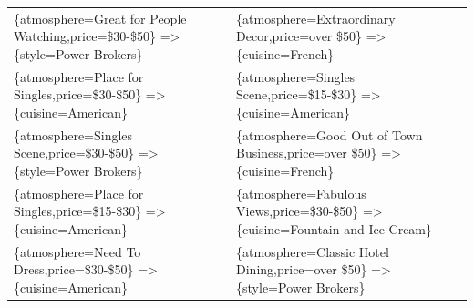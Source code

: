 \documentclass[letterpaper,10pt]{article}
\begin{document}
\begin{appendices}
\begin{table}[h]
\begin{adjustbox}{max width=\textwidth}
\begin{tabular}{ll}
\{atmosphere=Great for People Watching,price=\$30-\$50\} =\textgreater \{style=Power Brokers\} & \{atmosphere=Extraordinary Decor,price=over \$50\} =\textgreater \{cuisine=French\} \\ 
\{atmosphere=Place for Singles,price=\$30-\$50\} =\textgreater \{cuisine=American\} & \{atmosphere=Singles Scene,price=\$15-\$30\} =\textgreater \{cuisine=American\} \\ 
\{atmosphere=Singles Scene,price=\$30-\$50\} =\textgreater \{style=Power Brokers\} & \{atmosphere=Good Out of Town Business,price=over \$50\} =\textgreater \{cuisine=French\} \\ 
\{atmosphere=Place for Singles,price=\$15-\$30\} =\textgreater \{cuisine=American\} & \{atmosphere=Fabulous Views,price=\$30-\$50\} =\textgreater \{cuisine=Fountain and Ice Cream\} \\ 
\{atmosphere=Need To Dress,price=\$30-\$50\} =\textgreater \{cuisine=American\} & \{atmosphere=Classic Hotel Dining,price=over \$50\} =\textgreater \{style=Power Brokers\} \\ 
\end{tabular}
\end{adjustbox}
\end{table}
\clearpage
\newpage
\clearpage
\centering

\end{appendices}
\end{document}
